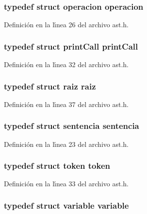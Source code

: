 \subsubsection{\setlength{\rightskip}{0pt plus 5cm}typedef struct {\bf operacion} {\bf operacion}}\label{ast_8h_a4}




Definici\'{o}n en la l\'{\i}nea 26 del archivo ast.h.
\subsubsection{\setlength{\rightskip}{0pt plus 5cm}typedef struct {\bf print\-Call} {\bf print\-Call}}\label{ast_8h_a10}




Definici\'{o}n en la l\'{\i}nea 32 del archivo ast.h.
\subsubsection{\setlength{\rightskip}{0pt plus 5cm}typedef struct {\bf raiz} {\bf raiz}}\label{ast_8h_a15}




Definici\'{o}n en la l\'{\i}nea 37 del archivo ast.h.
\subsubsection{\setlength{\rightskip}{0pt plus 5cm}typedef struct {\bf sentencia} {\bf sentencia}}\label{ast_8h_a1}




Definici\'{o}n en la l\'{\i}nea 23 del archivo ast.h.
\subsubsection{\setlength{\rightskip}{0pt plus 5cm}typedef struct {\bf token} {\bf token}}\label{ast_8h_a11}




Definici\'{o}n en la l\'{\i}nea 33 del archivo ast.h.
\subsubsection{\setlength{\rightskip}{0pt plus 5cm}typedef struct {\bf variable} {\bf variable}}\label{ast_8h_a2}




